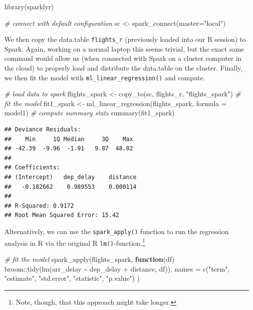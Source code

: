 \documentclass[
  12pt,
]{style/krantz}
\newenvironment{Shaded}{\begin{snugshade}}{\end{snugshade}}
\newcommand{\AttributeTok}[1]{\textcolor[rgb]{0.77,0.63,0.00}{#1}}
\newcommand{\CommentTok}[1]{\textcolor[rgb]{0.56,0.35,0.01}{\textit{#1}}}
\newcommand{\ControlFlowTok}[1]{\textcolor[rgb]{0.13,0.29,0.53}{\textbf{#1}}}
\newcommand{\FunctionTok}[1]{\textcolor[rgb]{0.00,0.00,0.00}{#1}}
\newcommand{\NormalTok}[1]{#1}
\newcommand{\OtherTok}[1]{\textcolor[rgb]{0.56,0.35,0.01}{#1}}
\newcommand{\SpecialCharTok}[1]{\textcolor[rgb]{0.00,0.00,0.00}{#1}}
\newcommand{\StringTok}[1]{\textcolor[rgb]{0.31,0.60,0.02}{#1}}
\begin{document}
\begin{Shaded}
\begin{Highlighting}[]
\FunctionTok{library}\NormalTok{(sparklyr)}

\CommentTok{\# connect with default configuration}
\NormalTok{sc }\OtherTok{\textless{}{-}} \FunctionTok{spark\_connect}\NormalTok{(}\AttributeTok{master=}\StringTok{"local"}\NormalTok{)}
\end{Highlighting}
\end{Shaded}

We then copy the data.table \texttt{flights\_r} (previously loaded into our R session) to Spark. Again, working on a normal laptop this seems trivial, but the exact same command would allow us (when connected with Spark on a cluster computer in the cloud) to properly load and distribute the data.table on the cluster. Finally, we then fit the model with \texttt{ml\_linear\_regression()} and compute.

\begin{Shaded}
\begin{Highlighting}[]
\CommentTok{\# load data to spark}
\NormalTok{flights\_spark }\OtherTok{\textless{}{-}} \FunctionTok{copy\_to}\NormalTok{(sc, flights\_r, }\StringTok{"flights\_spark"}\NormalTok{)}
\CommentTok{\# fit the model}
\NormalTok{fit1\_spark }\OtherTok{\textless{}{-}} \FunctionTok{ml\_linear\_regression}\NormalTok{(flights\_spark, }\AttributeTok{formula =}\NormalTok{ model1)}
\CommentTok{\# compute summary stats}
\FunctionTok{summary}\NormalTok{(fit1\_spark)}
\end{Highlighting}
\end{Shaded}

\begin{verbatim}
## Deviance Residuals:
##    Min     1Q Median     3Q    Max 
## -42.39  -9.96  -1.91   9.87  48.02 
## 
## Coefficients:
## (Intercept)   dep_delay    distance 
##   -0.182662    0.989553    0.000114 
## 
## R-Squared: 0.9172
## Root Mean Squared Error: 15.42
\end{verbatim}

Alternatively, we can use the \texttt{spark\_apply()} function to run the regression analysis in R via the original R \texttt{lm()}-function.\footnote{Note, though, that this approach might take longer.}

\begin{Shaded}
\begin{Highlighting}[]
\CommentTok{\# fit the model}
\FunctionTok{spark\_apply}\NormalTok{(flights\_spark, }\ControlFlowTok{function}\NormalTok{(df) broom}\SpecialCharTok{::}\FunctionTok{tidy}\NormalTok{(}\FunctionTok{lm}\NormalTok{(arr\_delay }\SpecialCharTok{\textasciitilde{}}\NormalTok{ dep\_delay }\SpecialCharTok{+}\NormalTok{ distance, df)),}
        \AttributeTok{names =} \FunctionTok{c}\NormalTok{(}\StringTok{"term"}\NormalTok{, }\StringTok{"estimate"}\NormalTok{, }\StringTok{"std.error"}\NormalTok{, }\StringTok{"statistic"}\NormalTok{, }\StringTok{"p.value"}\NormalTok{)}
\NormalTok{    )}
\end{Highlighting}
\end{Shaded}
\end{document}
